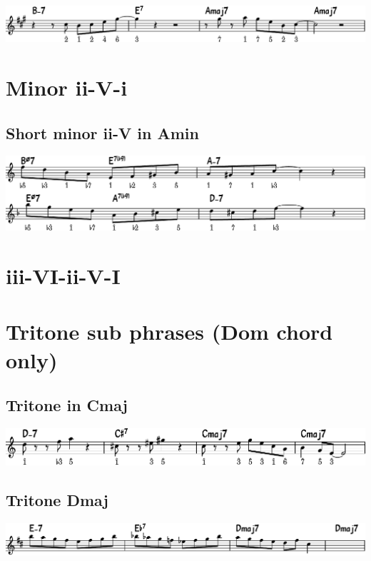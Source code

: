 \documentclass[11pt]{article}
\begin{document}
\begin{center}
\includegraphics[width=.98\linewidth]{ii-v-in-Amaj.pdf}
\end{center}


\section{Minor ii-V-i}
\label{sec:org1dc535c}
\subsection{Short minor ii-V in Amin}
\label{sec:org1340532}
\begin{center}
\includegraphics[width=.98\linewidth]{short-ii-v-in-Amin.pdf}
\end{center}

\section{iii-VI-ii-V-I}
\label{sec:org84b83ab}
\section{Tritone sub phrases (Dom chord only)}
\label{sec:orgf71f566}

\subsection{Tritone in Cmaj}
\label{sec:org91ab510}
\begin{center}
\includegraphics[width=.98\linewidth]{tritone-c-maj.pdf}
\end{center}

\subsection{Tritone Dmaj}
\label{sec:orgf1fa15d}
\begin{center}
\includegraphics[width=.98\linewidth]{tritone-d-maj.pdf}
\end{center}
\end{document}

